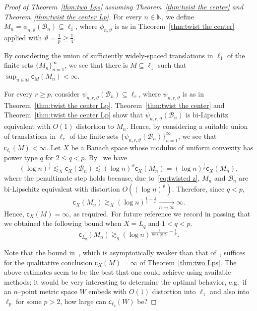\documentclass[11pt,reqno]{amsart}
\newcommand{\N}{\mathbb{N}}
\newcommand{\cc}{{\mathsf{c}}}
\newcommand{\0}{\mathbf{0}}
\renewcommand{\1}{\mathbf 1}
\renewcommand{\subset}{\subseteq}
\renewcommand{\ge}{\geqslant}
\renewcommand{\le}{\leqslant}
\theoremstyle{remark}
\begin{document}
\begin{proof}[Proof of Theorem~\ref{thm:two Lps} assuming Theorem~\ref{thm:twist the center} and Theorem~\ref{thm:twist the center Lp}]  For every $n\in \N$, we define  $M_n=\phi_{n,\vartheta}(\mathcal{B}_n)\subset \ell_1$, where  $\phi_{n,\vartheta}$ is as in Theorem~\ref{thm:twist the center} applied with $\vartheta=\frac{1}{p}\ge \frac14$.

By considering the union of sufficiently widely-spaced translations in $\ell_1$ of the finite sets $\{M_n\}_{n=1}^\infty$, we see that there is $M\subset \ell_1$ such that $\sup_{n\in \N} \cc_M(M_n)<\infty$.

For every $r\ge p$, consider $\psi_{n,r,\vartheta}(\mathcal{B}_n)\subset \ell_r$, where $\psi_{n,r,\vartheta}$ is as in  Theorem~\ref{thm:twist the center Lp}. Theorem~\ref{thm:twist the center} and Theorem~\ref{thm:twist the center Lp} show that $\psi_{n,r,\vartheta}(\mathcal{B}_n)$ is bi-Lipschitz equivalent with $O(1)$ distortion to $M_n$. Hence, by  considering a suitable union of translations in $\ell_r$ of the finite sets $\{\psi_{n,r,\vartheta}(\mathcal{B}_n)\}_{n=1}^\infty$, we see that $\cc_{\ell_r}(M)<\infty$. Let $X$ be a Banach space whose modulus of uniform convexity has power type $q$ for  $2\le q<p$.  By~\cite{LafforgueNaor} we have
$$
(\log n)^{\frac{1}{q}}\lesssim_X \cc_{X}(\mathcal{B}_n) \lesssim (\log n)^\vartheta\cc_{X}(M_n)=(\log n)^{\frac{1}{p}}\cc_{X}(M_n),
$$
where the penultimate step holds because, due to~\eqref{eq:twisted z}, $M_n$ and $\mathcal{B}_n$ are bi-Lipschitz equivalent with distortion $O((\log n)^\vartheta)$.  Therefore, since $q<p$,
$$
\cc_{X}(M_n)\gtrsim_X (\log n)^{\frac{1}{q}-\frac{1}{p}} \xrightarrow[n\to \infty]{} \infty.
$$
Hence, $\cc_X(M)=\infty$, as required. For future reference we record in passing that we obtained the following bound when $X=L_q$ and $1<q<p$.
\begin{equation}\label{eq:Lq case}
\cc_{L_q}(M_n)\gtrsim_q (\log n)^{\frac{1}{\max\{q,2\}}-\frac{1}{p}}.
\end{equation}

Note that the  bound in~\cite{AusNaoTes}, which is asymptotically weaker than that of~\cite{LafforgueNaor},  suffices for the qualitative conclusion $\cc_X(M)=\infty$ of Theorem~\ref{thm:two Lps}. The above estimates seem to be the best that one could achieve using available methods; it would be very interesting to determine the optimal behavior, e.g.~if an $n$--point metric space $W$ embeds with $O(1)$ distortion into  $\ell_1$ and also into $\ell_p$ for some $p>2$, how large can $\cc_{\ell_2}(W)$ be?
\end{proof}
\end{document}
